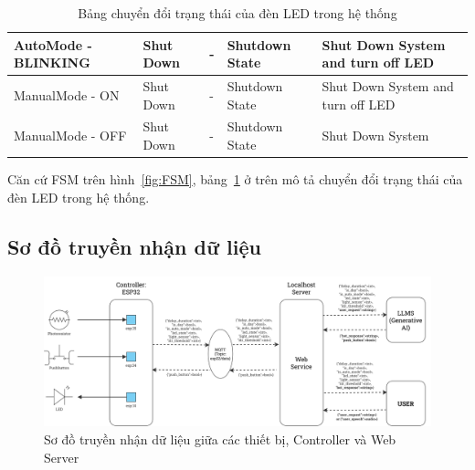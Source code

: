 {\begin{table}[H]
\begin{tabular}{|p{2.3cm}|p{3cm}|p{4cm}|p{2cm}|p{4cm}|}
AutoMode - BLINKING                                                 & Shut Down                                                  & -                                                              & Shutdown State                                                               & Shut Down System and turn off LED         \\ \hline
ManualMode - ON                                                     & Shut Down                                                  & -                                                              & Shutdown State                                                               & Shut Down System and turn off LED         \\ \hline
ManualMode - OFF                                                    & Shut Down                                                  & -                                                              & Shutdown State                                                               & Shut Down System                          \\ \hline
\end{tabular}
\caption{Bảng chuyển đổi trạng thái của đèn LED trong hệ thống}
\label{tab:FSM}
\end{table}

Căn cứ FSM trên hình~\ref{fig:FSM}, bảng~\ref{tab:FSM} ở trên mô tả chuyển đổi trạng thái của đèn LED trong hệ thống. 


\subsection{Sơ đồ truyền nhận dữ liệu}
\begin{figure}[H]
    \centering
    \includegraphics[width=\textwidth]{img/Data.jpg}
    \caption{Sơ đồ truyền nhận dữ liệu giữa các thiết bị, Controller và Web Server}
    \label{fig:Data}
\end{figure}

}
